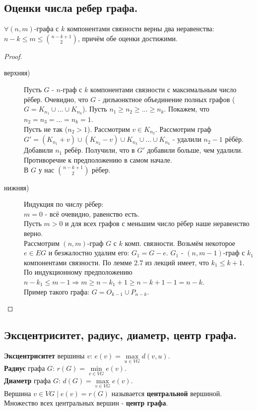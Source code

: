 \documentclass[12pt]{article}
\begin{document}
\subsection{Оценки числа ребер графа.}
		$\forall (n,m)$-графа с $k$ компонентами связности верны два неравенства: $ \displaystyle n-k \le m \le \binom{n-k+1}{2}$, причём обе оценки достижими.
	\begin{proof}\hfil
		\begin{description}
			\item[верхняя)] Пусть $G$ - $n$-граф с $k$ компонентами связности с максимальным число рёбер. Очевидно, что $G$ - дизъюнктное объединение полных графов
				($G = K_{n_1} \cup ... \cup K_{n_k}$). Пусть $n_1 \ge n_2 \ge ... \ge n_k$. Покажем, что $n_2 = n_3 = ... = n_k = 1$.\\
				Пусть не так ($n_2 > 1$). Рассмотрим $v \in K_{n_2}$. Рассмотрим граф $G' = (K_{n_1} + v) \cup (K_{n_2} - v) \cup K_{n_3} \cup ... \cup K_{n_k} $ - 
				удалили $n_2-1$ рёбёр. Добавили $n_1$ ребёр. Получили, что в $G'$ добавили больше, чем удалили. Противоречие к предположению в самом начале.\\
				В $G$ у нас $\binom{n-k+1}{2}$ рёбер.
			\item[нижняя)] Индукция по числу рёбер:\\
				$m=0$ - всё очевидно, равенство есть.\\
				Пусть $m>0$ и для всех графов с меньшим число рёбер наше неравенство верно.\\
				Рассмотрим $(n,m)$-граф $G$ с $k$ комп. связности. Возьмём некоторое $e \in EG$ и безжалостно удалим его: $G_1 = G-e$. $G_1$ - $(n,m-1)$-граф с $k_1$ компонентами связности. По лемме 2.7 из лекций имеет, что $k_1 \le k+1$. По индукционному предположению $n-k_1 \le m-1 \Rightarrow m\ge n-k_1+1 \ge n-k+1-1=n-k$.\\
				Пример такого графа: $G = O_{k-1} \cup P_{n-k}$.
		\end{description}
	\end{proof}
\subsection{Эксцентриситет, радиус, диаметр, центр графа.}
	\textbf{Эксцентриситет} вершины $v$: $e(v) =  \underset{ u \in VG}{\max} d(v,u)$.\\
	\textbf{Радиус} графа $G$: $r(G) = \underset{v \in VG}{\min} e(v)$.\\
	\textbf{Диаметр} графа $G$: $d(G) = \underset{v \in VG}{\max} e(v)$.\\
	Вершина $v \in VG\mid e(v) = r(G)$ называется \textbf{центральной} вершиной.\\
	Множество всех центральных вершин - \textbf{центр графа}.
\end{document}
